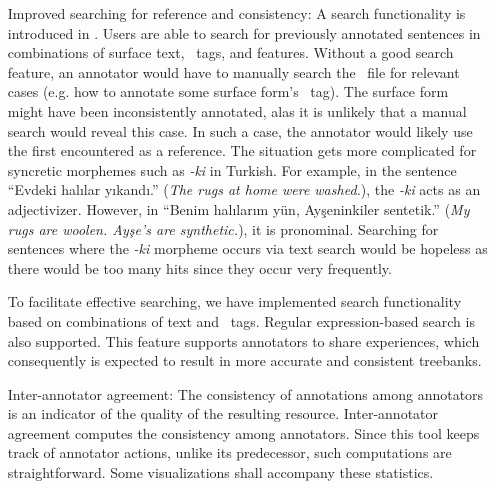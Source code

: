 \begin{itemize}[before=\normalfont, font=\itshape, align=left,noitemsep,topsep=0pt,parsep=3pt,partopsep=0pt,labelsep=3pt,align=left]
    \item[Improved searching for reference and consistency:]
        A search functionality is introduced in \boatvtwo.
        Users are able to search for previously annotated sentences in combinations of surface text, \ud\ tags, and features.
		Without a good search feature, an annotator would have to manually search the \conllu\ file for relevant cases (e.g. how to annotate some surface form's \upos\ tag).
		The surface form might have been inconsistently annotated, alas it is unlikely that a manual search would reveal this case.
		In such a case, the annotator would likely use the first encountered as a reference.
        The situation gets more complicated for syncretic morphemes such as \textit{-ki} in Turkish.
        For example, in the sentence ``Evdeki halılar yıkandı.'' (\textit{The rugs at home were washed.}), the \textit{-ki} acts as an adjectivizer.
        However, in ``Benim halılarım yün, Ayşeninkiler sentetik.'' (\textit{My rugs are woolen. Ayşe's are synthetic.}), it is pronominal.
        Searching for sentences where the \textit{-ki} morpheme occurs via text search would be hopeless as there would be too many hits since they occur very frequently.

        To facilitate effective searching, we have implemented search functionality based on combinations of text and \ud\ tags.
        Regular expression-based search is also supported.
        This feature supports annotators to share experiences, which consequently is expected to result in more accurate and consistent treebanks.

    \item[Inter-annotator agreement:]
        The consistency of annotations among annotators is an indicator of the quality of the resulting resource.
        Inter-annotator agreement computes the consistency among annotators.
        Since this tool keeps track of annotator actions, unlike its predecessor, such computations are straightforward.
        Some visualizations shall accompany these statistics.

\end{itemize}
